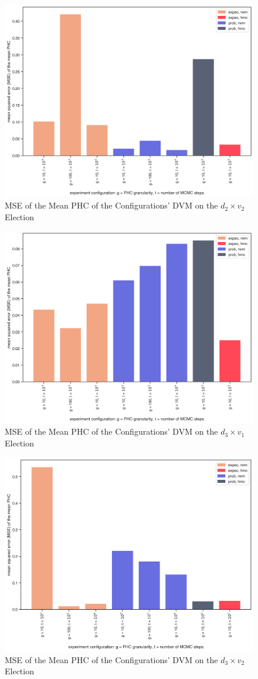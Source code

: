 \begin{figure}[ht]\centering
 \includegraphics[width=0.75\linewidth]{figures/2_2_mean_mse.png}
 \caption{MSE of the Mean PHC of the Configurations' DVM on the $d_2 \times v_2$ Election}
 \label{fig:2_2_mean_mse}
\end{figure}

\begin{figure}[ht]\centering
 \includegraphics[width=0.75\linewidth]{figures/3_1_mean_mse.png}
 \caption{MSE of the Mean PHC of the Configurations' DVM on the $d_3 \times v_1$ Election}
 \label{fig:3_1_mean_mse}
\end{figure}

\begin{figure}[ht]\centering
 \includegraphics[width=0.75\linewidth]{figures/3_2_mean_mse.png}
 \caption{MSE of the Mean PHC of the Configurations' DVM on the $d_3 \times v_2$ Election}
 \label{fig:3_2_mean_mse}
\end{figure}

